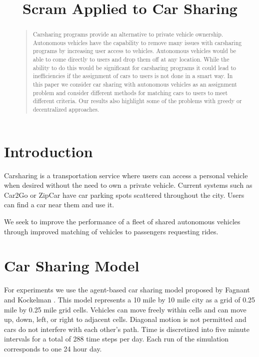 \documentclass[letterpaper]{article}
\begin{document}
%
\title{Scram Applied to Car Sharing}
\author{}
\maketitle
\begin{abstract}
\begin{quote}
Carsharing programs provide an alternative to private vehicle ownership. Autonomous vehicles have the capability to remove many issues with carsharing programs by increasing user access to vehicles. Autonomous vehicles would be able to come directly to users and drop them off at any location. While the ability to do this would be significant for carsharing programs it could lead to inefficiencies if the assignment of cars to users is not done in a smart way. In this paper we consider car sharing with autonomous vehicles as an assignment problem and consider different methods for matching cars to users to meet different criteria. Our results also highlight some of the problems with greedy or decentralized approaches.
\end{quote}
\end{abstract}

\noindent 

\section{Introduction}
Carsharing is a transportation service where users can access a personal vehicle when desired without the need to own a private vehicle. Current systems such as Car2Go or ZipCar have car parking spots scattered throughout the city. Users can find a car near them and use it.


We seek to improve the performance of a fleet of shared autonomous vehicles through improved matching of vehicles to passengers requesting rides. 

\section{Car Sharing Model}

For experiments we use the agent-based car sharing model proposed by Fagnant and Kockelman \cite{fagnant2014travel}. This model represents a 10 mile by 10 mile city as a grid of 0.25 mile by 0.25 mile grid cells. Vehicles can move freely within cells and can move up, down, left, or right to adjacent cells. Diagonal motion is not permitted and cars do not interfere with each other's path. Time is discretized into five minute intervals for a total of 288 time steps per day. Each run of the simulation corresponds to one 24 hour day.
\end{document}
